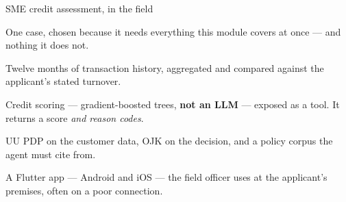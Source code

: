 \documentclass[aspectratio=169,11pt,t]{beamer}
\begin{document}
\begin{frame}[shrink=25]{SME credit assessment, in the field}
{\fontsize{9.4}{12.6}\selectfont\color{fg2}One case, chosen because it needs everything this module covers at once --- and nothing it does not.\par}\vskip 4pt
\begin{minipage}[t]{0.494\textwidth}
\begin{icardaccent}
Twelve months of transaction history, aggregated and compared against the applicant's stated turnover.
\end{icardaccent}
\end{minipage}%
\hfill
\begin{minipage}[t]{0.494\textwidth}
\begin{icardaccent}
Credit scoring --- gradient-boosted trees, \textbf{not an LLM} --- exposed as a tool. It returns a score \textit{and reason codes}.
\end{icardaccent}
\end{minipage}%


\vskip 4pt

\begin{minipage}[t]{0.494\textwidth}
\begin{icardaccent}
UU PDP on the customer data, OJK on the decision, and a policy corpus the agent must cite from.
\end{icardaccent}
\end{minipage}%
\hfill
\begin{minipage}[t]{0.494\textwidth}
\begin{icardaccent}
A Flutter app --- Android and iOS --- the field officer uses at the applicant's premises, often on a poor connection.
\end{icardaccent}
\end{minipage}%
\end{frame}
\end{document}
